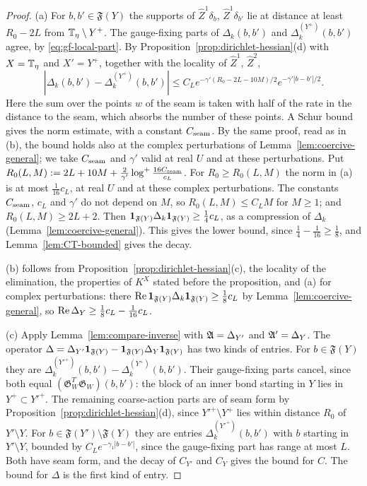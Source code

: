 \begin{proof}
(a) For $b,b'\in\mathfrak F(Y)$ the supports of $\hat Z^1\delta_b$, $\hat Z^1\delta_{b'}$ lie at distance at least $R_0-2L$ from $\mathbb T_\eta\setminus Y^+$. The gauge-fixing parts of $\Delta_k(b,b')$ and $\Delta^{(Y^+)}_k(b,b')$ agree, by \eqref{eq:gf-local-part}. By Proposition~\ref{prop:dirichlet-hessian}(d) with $X=\mathbb T_\eta$ and $X'=Y^+$, together with the locality of $\hat Z^1$, $\hat Z^2$,
\[
|\Delta_k(b,b')-\Delta^{(Y^+)}_k(b,b')|\le C_Le^{-\gamma'(R_0-2L-10M)/2}e^{-\gamma'|b-b'|/2}.
\]
Here the sum over the points $w$ of the seam is taken with half of the rate in the distance to the seam, which absorbs the number of these points. A Schur bound gives the norm estimate, with a constant $C_{\rm seam}$. By the same proof, read as in (b), the bound holds also at the complex perturbations of Lemma~\ref{lem:coercive-general}; we take $C_{\rm seam}$ and $\gamma'$ valid at real $U$ and at these perturbations. Put $R_0(L,M):=2L+10M+\frac2{\gamma'}\log^+\frac{16C_{\rm seam}}{c_L}$. For $R_0\ge R_0(L,M)$ the norm in (a) is at most $\frac1{16}c_L$, at real $U$ and at these complex perturbations. The constants $C_{\rm seam}$, $c_L$ and $\gamma'$ do not depend on $M$, so $R_0(L,M)\le C_LM$ for $M\ge1$; and $R_0(L,M)\ge2L+2$. Then $\mathbf 1_{\mathfrak F(Y)}\Delta_k\mathbf 1_{\mathfrak F(Y)}\ge\frac14c_L$, as a compression of $\Delta_k$ (Lemma~\ref{lem:coercive-general}). This gives the lower bound, since $\frac14-\frac1{16}\ge\frac18$, and Lemma~\ref{lem:CT-bounded} gives the decay.

(b) follows from Proposition~\ref{prop:dirichlet-hessian}(c), the locality of the elimination, the properties of $K^X$ stated before the proposition, and (a) for complex perturbations: there $\operatorname{Re}\mathbf 1_{\mathfrak F(Y)}\Delta_k\mathbf 1_{\mathfrak F(Y)}\ge\frac18c_L$ by Lemma~\ref{lem:coercive-general}, so $\operatorname{Re}\Delta_Y\ge\frac18c_L-\frac1{16}c_L$.

(c) Apply Lemma~\ref{lem:compare-inverse} with $\mathfrak A=\Delta_{Y'}$ and $\mathfrak A'=\Delta_Y$. The operator $\Delta=\Delta_{Y'}\mathbf 1_{\mathfrak F(Y)}-\mathbf 1_{\mathfrak F(Y)}\Delta_Y\mathbf 1_{\mathfrak F(Y)}$ has two kinds of entries. For $b\in\mathfrak F(Y)$ they are $\Delta^{(Y'^+)}_k(b,b')-\Delta^{(Y^+)}_k(b,b')$. Their gauge-fixing parts cancel, since both equal $(\mathfrak G_W^T\mathfrak G_W)(b,b')$: the block of an inner bond starting in $Y$ lies in $Y^+\subset Y'^+$. The remaining coarse-action parts are of seam form by Proposition~\ref{prop:dirichlet-hessian}(d), since $Y'^+\setminus Y^+$ lies within distance $R_0$ of $Y'\setminus Y$. For $b\in\mathfrak F(Y')\setminus\mathfrak F(Y)$ they are entries $\Delta^{(Y'^+)}_k(b,b')$ with $b$ starting in $Y'\setminus Y$, bounded by $C_Le^{-\gamma_1|b-b'|}$, since the gauge-fixing part has range at most $L$. Both have seam form, and the decay of $C_{Y'}$ and $C_Y$ gives the bound for $C$. The bound for $\Delta$ is the first kind of entry.
\end{proof}

